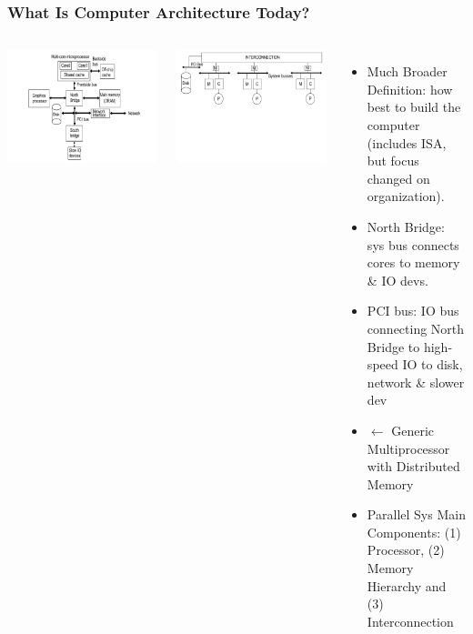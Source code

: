 \documentclass{beamer}
\newcommand{\emp}[1]{\textcolor{DikuRed}{ #1}}
\begin{document}
\begin{frame}[fragile,t]
\frametitle{What Is Computer Architecture Today?}

\begin{columns}
\hspace{-6ex}\includegraphics[width=44ex]{Figures/L1/SimpleCPU}

\includegraphics[width=39ex]{Figures/L1/SimpleInterconnect}
\vspace{-17ex}
\begin{itemize}
    \item \emp{Much Broader Definition}: how best to build the computer 
            (includes ISA, but focus changed on organization).\medskip

    \item North Bridge: sys bus connects cores to memory \& IO devs.
    \item PCI bus: IO bus connecting North Bridge to high-speed IO 
            to disk, network \& slower dev\medskip

    \item $\leftarrow$ Generic Multiprocessor with Distributed Memory\medskip

    \item \alert{Parallel Sys Main Components:
                (1) Processor, (2) Memory Hierarchy and 
                (3) Interconnection}
\end{itemize}
\end{columns}

\end{frame}
\end{document}
